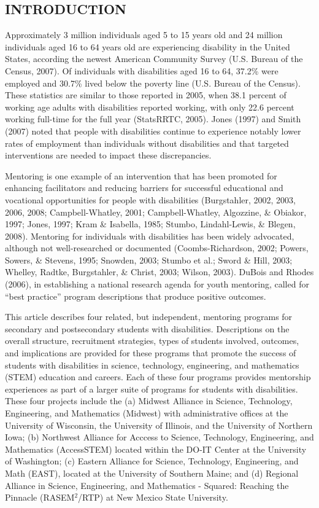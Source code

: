 \documentclass[11.5pt]{sig-alternate} %
\begin{document}
\pagebreak
\clearpage
\begin{large}
\section*{INTRODUCTION}
Approximately 3 million individuals aged 5 to 15 years old and 24 million individuals aged 16 to 64 years old are experiencing disability in the United States, according the newest American Community Survey (U.S. Bureau of the Census, 2007). Of individuals with disabilities aged 16 to 64, 37.2\% were employed and 30.7\% lived below the poverty line (U.S. Bureau of the Census). These statistics are similar to those reported in 2005, when 38.1 percent of working age adults with disabilities reported working, with only 22.6 percent working full-time for the full year (StatsRRTC, 2005). Jones (1997) and Smith (2007) noted that people with disabilities continue to experience notably lower rates of employment than individuals without disabilities and that targeted interventions are needed to impact these discrepancies.

Mentoring is one example of an intervention that has been promoted for enhancing facilitators and reducing barriers for successful educational and vocational opportunities for people with disabilities (Burgstahler, 2002, 2003, 2006, 2008; Campbell-Whatley, 2001; Campbell-Whatley, Algozzine, \& Obiakor, 1997; Jones, 1997; Kram \& Isabella, 1985; Stumbo, Lindahl-Lewis, \& Blegen, 2008). Mentoring for individuals with disabilities has been widely advocated, although not well-researched or documented (Coombs-Richardson, 2002; Powers, Sowers, \& Stevens, 1995; Snowden, 2003; Stumbo et al.; Sword \& Hill, 2003; Whelley, Radtke, Burgstahler, \& Christ, 2003; Wilson, 2003). DuBois and Rhodes (2006), in establishing a national research agenda for youth mentoring, called for “best practice” program descriptions that produce positive outcomes.

This article describes four related, but independent, mentoring programs for secondary and postsecondary students with disabilities. Descriptions on the overall structure, recruitment strategies, types of students involved, outcomes, and implications are provided for these programs that promote the success of students with disabilities in science, technology, engineering, and mathematics (STEM) education and careers. Each of these four programs provides mentorship experiences as part of a larger suite of programs for students with disabilities. These four projects include the (a) Midwest Alliance in Science, Technology, Engineering, and Mathematics (Midwest) with administrative offices at the University of Wisconsin, the University of Illinois, and the University of Northern Iowa; (b) Northwest Alliance for Acccess to Science, Technology, Engineering, and Mathematics (AccessSTEM) located within the DO-IT Center at the University of Washington; (c) Eastern Alliance for Science, Technology, Engineering, and Math (EAST), located at the University of Southern Maine; and (d) Regional Alliance in Science, Engineering, and Mathematics - Squared: Reaching the Pinnacle (RASEM$^2$/RTP) at New Mexico State University.


\end{large}
\end{document}
